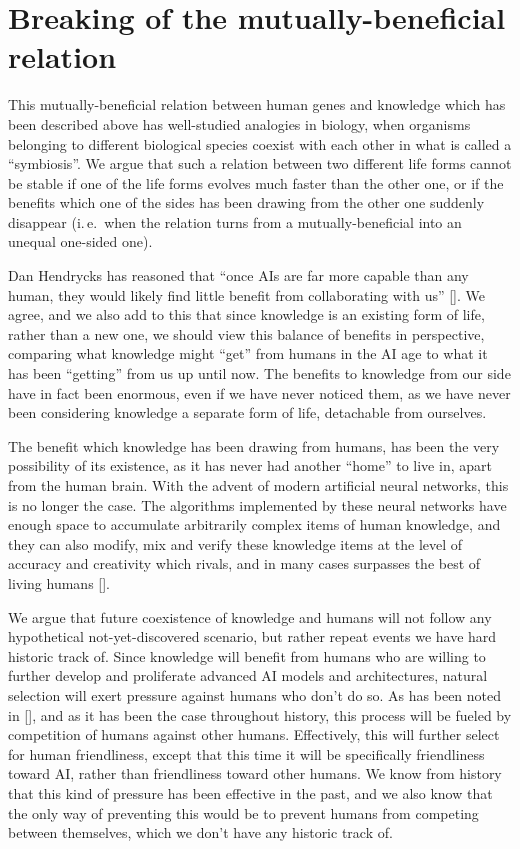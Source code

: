 \documentclass[12pt]{article}
\newcommand{\citestrut}[1]{\vphantom{[}{#1}\vphantom{]}}
\renewcommand{\cite}[1]{[\hyperlink{#1}{\citestrut{#1}}]}
\begin{document}
\section{Breaking of the mutually-beneficial relation}

This mutually-beneficial relation between human genes and knowledge which has been
described above has well-studied analogies in biology, when organisms belonging to
different biological species coexist with each other in what is called a ``symbiosis''.
We argue that such a relation between two different life forms cannot be stable if one of
the life forms evolves much faster than the other one, or if the benefits which one of
the sides has been drawing from the other one suddenly disappear (i.\,e.\ when the
relation turns from a mutually-beneficial into an unequal one-sided one).

Dan Hendrycks has reasoned that ``once AIs are far more capable than any human, they
would likely find little benefit from collaborating with us'' \cite{NaturalSelection}. We
agree, and we also add to this that since knowledge is an existing form of life, rather
than a new one, we should view this balance of benefits in perspective, comparing what
knowledge might ``get'' from humans in the AI age to what it has been ``getting'' from us
up until now. The benefits to knowledge from our side have in fact been enormous, even if
we have never noticed them, as we have never been considering knowledge a separate form
of life, detachable from ourselves.

The benefit which knowledge has been drawing from humans, has been the very possibility
of its existence, as it has never had another ``home'' to live in, apart from the human
brain. With the advent of modern artificial neural networks, this is no longer the case.
The algorithms implemented by these neural networks have enough space to accumulate
arbitrarily complex items of human knowledge, and they can also modify, mix and verify
these knowledge items at the level of accuracy and creativity which rivals, and in many
cases surpasses the best of living humans \cite{IMO}.

We argue that future coexistence of knowledge and humans will not follow any hypothetical
not-yet-discovered scenario, but rather repeat events we have hard historic track of.
Since knowledge will benefit from humans who are willing to further develop and
proliferate advanced AI models and architectures, natural selection will exert pressure
against humans who don't do so. As has been noted in \cite{NaturalSelection}, and as it
has been the case throughout history, this process will be fueled by competition of
humans against other humans. Effectively, this will further select for human
friendliness, except that this time it will be specifically friendliness toward AI,
rather than friendliness toward other humans. We know from history that this kind of
pressure has been effective in the past, and we also know that the only way of preventing
this would be to prevent humans from competing between themselves, which we don't have
any historic track of.
\end{document}
